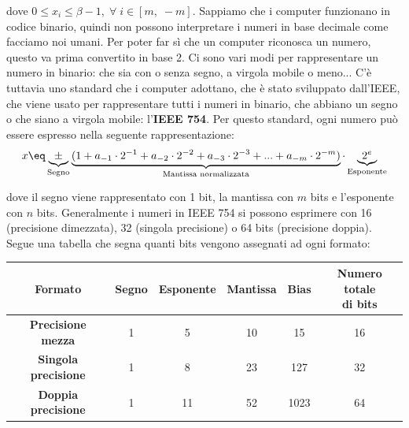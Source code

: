 dove $0 \leq x_i \leq \beta - 1, \; \forall \; i \in [m, \; -m]$.
\nl
Sappiamo che i computer funzionano in codice binario, quindi non possono interpretare i numeri in base decimale come facciamo noi umani. Per poter far sì che un computer riconosca un numero, questo va prima convertito in base 2. Ci sono vari modi per rappresentare un numero in binario: che sia con o senza segno, a virgola mobile o meno... C'è tuttavia uno standard che i computer adottano, che è stato sviluppato dall'IEEE, che viene usato per rappresentare tutti i numeri in binario, che abbiano un segno o che siano a virgola mobile: l'\textbf{IEEE 754}.
\nl
Per questo standard, ogni numero può essere espresso nella seguente rappresentazione:
\[ x \eq \underbrace{\pm}_{\text{Segno}} \underbrace{(1 + a_{-1} \cdot 2^{-1} + a_{-2} \cdot 2^{-2} + a_{-3} \cdot 2^{-3} + ... + a_{-m} \cdot 2^{-m})}_{\text{Mantissa normalizzata}} \cdot \underbrace{2^e}_{\text{Esponente}} \]

dove il segno viene rappresentato con 1 bit, la mantissa con $m$ bits e l'esponente con $n$ bits. Generalmente i numeri in IEEE 754 si possono esprimere con 16 (precisione dimezzata), 32 (singola precisione) o 64 bits (precisione doppia). Segue una tabella che segna quanti bits vengono assegnati ad ogni formato:
\begin{center}
    \begin{tabular}{|c|c|c|c|c|c|}
        \hline
        \textbf{Formato} & \textbf{Segno} & \textbf{Esponente} & \textbf{Mantissa} & \textbf{Bias} & \makecell{\textbf{Numero totale}\\\textbf{di bits}} \\
        \hline\hline
        \textbf{Precisione mezza} & 1 & 5 & 10 & 15 & 16 \\
        \hline
        \textbf{Singola precisione} & 1 & 8 & 23 & 127 & 32 \\
        \hline
        \textbf{Doppia precisione} & 1 & 11 & 52 & 1023 & 64 \\
        \hline
    \end{tabular}
\end{center}